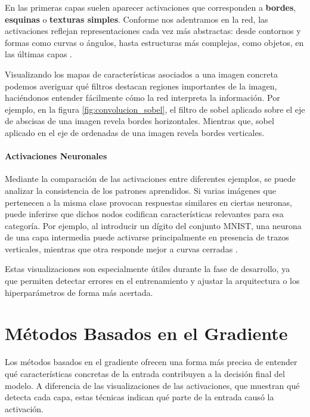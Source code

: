 En las primeras capas suelen aparecer activaciones que corresponden a \textbf{bordes}, \textbf{esquinas} o \textbf{texturas simples}. Conforme nos adentramos en la red, las activaciones reflejan representaciones cada vez más abstractas: desde contornos y formas como curvas o ángulos, hasta estructuras más complejas, como objetos, en las últimas capas \cite{nn_dl__michael_nielsen_2015}.

Visualizando los mapas de características asociados a una imagen concreta podemos averiguar qué filtros destacan regiones importantes de la imagen, haciéndonos entender fácilmente cómo la red interpreta la información. Por ejemplo, en la figura \ref{fig:convolucion_sobel}, el filtro de sobel aplicado sobre el eje de abscisas de una imagen revela bordes horizontales. Mientras que, sobel aplicado en el eje de ordenadas de una imagen revela bordes verticales.

\paragraph{Activaciones Neuronales}

Mediante la comparación de las activaciones entre diferentes ejemplos, se puede analizar la consistencia de los patrones aprendidos. Si varias imágenes que pertenecen a la misma clase provocan respuestas similares en ciertas neuronas, puede inferirse que dichos nodos codifican características relevantes para esa categoría. Por ejemplo, al introducir un dígito del conjunto MNIST, una neurona de una capa intermedia puede activarse principalmente en presencia de trazos verticales, mientras que otra responde mejor a curvas cerradas \cite{nn_dl__michael_nielsen_2015}.

Estas visualizaciones son especialmente útiles durante la fase de desarrollo, ya que permiten detectar errores en el entrenamiento y ajustar la arquitectura o los hiperparámetros de forma más acertada.

\section{Métodos Basados en el Gradiente}

Los métodos basados en el gradiente ofrecen una forma más precisa de entender qué características concretas de la entrada contribuyen a la decisión final del modelo. A diferencia de las visualizaciones de las activaciones, que muestran qué detecta cada capa, estas técnicas indican qué parte de la entrada causó la activación.

